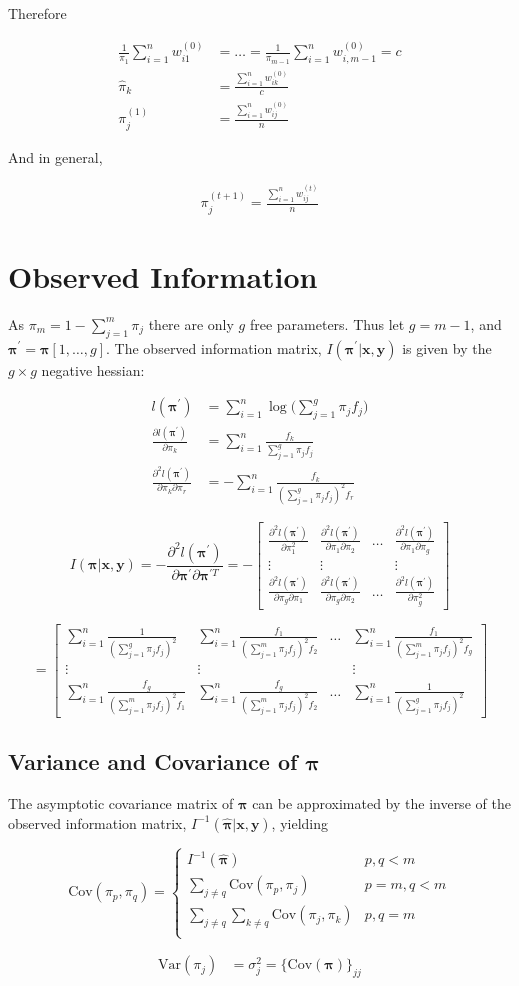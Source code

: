 \documentclass[12pt]{amsart}
\newcommand{\vect}[1]{\boldsymbol{\mathbf{#1}}}
\newcommand{\eqn}[1]{\begin{align*}
#1
\end{align*}}
\newcommand{\Bl}{\Big\{}
\newcommand{\Br}{\Big\}}
\newcommand{\mtx}[4]{
\[
#1 = #2
\left[ {\begin{array}{#3}
 #4
 \end{array} } \right]
\]
}
\newcommand{\eqnset}[4]{
\[ #1 = #2 \left\{ \begin{array}{#3}
        #4
\end{array} \right. \] 
}
\newcommand{\vx}{\vect{x}}
\newcommand{\vy}{\vect{y}}
\newcommand{\vp}{\vect{\pi}}
\newcommand{\vph}{\hat{\vect{\pi}}}
\newcommand{\fab}{f_j}
\newcommand{\llpp}{l(\vect{\pi^\prime})}
\newcommand{\hessll}[2]{\sumn \frac{f_{#1}}{(\summ \pi_j f_j)^2 f_{#2}}}
\newcommand{\hesslld}[2]{\frac{\partial^2 \llpp}{\partial \pi_{#1} \partial \pi_{#2}}}
\newcommand{\sumn}{\sum^n_{i=1}}
\newcommand{\summ}{\sum^m_{j=1}}
\newcommand{\sumg}{\sum^g_{j=1}}
\begin{document}
Therefore


\eqn{
	\frac{1}{\pi_1} \sumn w^{(0)}_{i1} &= \ldots = \frac{1}{\pi_{m-1}} \sumn w^{(0)}_{i,m-1} = c	\\
	\hat{\pi}_k &= \frac{\sumn w^{(0)}_{ik}}{c}		\\
	\pi^{(1)}_j &= \frac{\sumn w^{(0)}_{ij}}{n}
}

And in general,


\eqn{
	\pi^{(t+1)}_j = \frac{\sumn w^{(t)}_{ij}}{n}
}




\clearpage
\section{Observed Information}

As $\pi_m = 1-\summ \pi_j$ there are only $g$ free parameters. Thus let $g=m-1$, and $\vp^\prime=\vp[1,\ldots,g]$. The observed information matrix, $I(\vp^\prime|\vx,\vy)$ is given by the $g\times g$ negative hessian:

\eqn{
	\llpp &= \sumn \log \Big( \sumg \pi_j \fab  \Big)		\\
	\frac{\partial \llpp}{\partial \pi_k} &= \sumn \frac{f_k}{\sumg \pi_j f_j}	\\
	\frac{\partial^2 \llpp}{\partial \pi_k \partial \pi_r} &= -\sumn \frac{f_k}{(\sumg \pi_j f_j)^2 f_r}
}

\mtx{I(\vp|\vx,\vy)=-\frac{\partial^2 \llpp}{\partial \vp^\prime \partial \vp^{\prime T}}}{-}{cccc}{
	\frac{\partial^2 \llpp}{\partial \pi_1^2} & \hesslld{1}{2} & \ldots & \hesslld{1}{g}	\\
	\vdots & \vdots & & \vdots	\\
	\hesslld{g}{1} & \hesslld{g}{2} & \ldots & \frac{\partial^2 \llpp}{\partial \pi_{g}^2}
}

\mtx{}{}{cccc}{
	\sumn \frac{1}{(\sumg \pi_j f_j)^2} & \hessll{1}{2} & \ldots & \hessll{1}{g}	\\
	\vdots & \vdots & & \vdots	\\
	\hessll{g}{1} & \hessll{g}{2} & \ldots & \sumn \frac{1}{(\sumg \pi_j f_j)^2}
}


\subsection{Variance and Covariance of $\vp$}
The asymptotic covariance matrix of $\vp$ can be approximated by the inverse of the observed information matrix, $I^{-1}(\vph|\vx,\vy)$, yielding

\eqnset{\text{Cov}(\pi_p,\pi_q)}{}{ll}{
	I^{-1}(\vph) 				& p,q<m	\\
	\sum\limits_{j\neq q} \text{Cov}(\pi_p,\pi_j)		& p=m,q<m	\\
	\sum\limits_{j\neq q}\sum\limits_{k\neq q} \text{Cov}(\pi_j,\pi_k)		& p, q=m	\\
}

\eqn{
	\text{Var}(\pi_j) &= \sigma^2_j = \Bl \text{Cov}(\vp) \Br_{jj}
}
\end{document}
